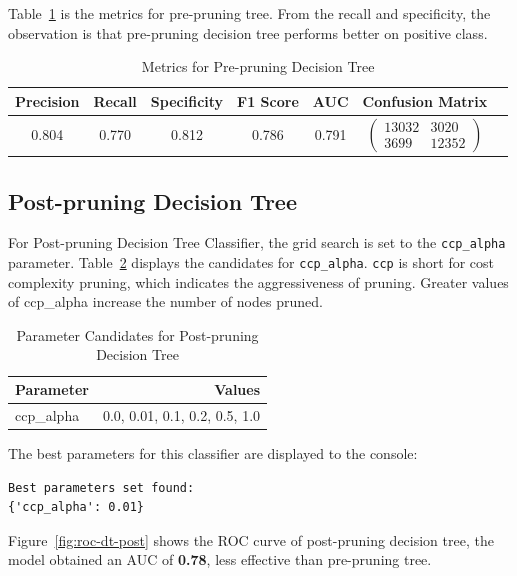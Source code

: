 Table~\ref{tab:pre-dt} is the metrics for pre-pruning tree. From the recall and specificity, the observation is that pre-pruning decision tree performs better on positive class.

\begin{table}
\centering
\begin{tabular}{|c|c|c|c|c|c|c}
\hline
\textbf{Precision} & \textbf{Recall} & \textbf{Specificity} & \textbf{F1 Score} & \textbf{AUC} & \textbf{Confusion Matrix} \\
\hline
0.804 & 0.770 & 0.812 & 0.786 & 0.791 & $\left(\begin{array}{cc} 13032 & 3020 \\ 3699 & 12352 \end{array}\right)$ \\ 
\hline
\end{tabular}
\caption{Metrics for Pre-pruning Decision Tree}
\label{tab:pre-dt}
\end{table}

\subsection{Post-pruning Decision Tree}

For Post-pruning Decision Tree Classifier, the grid search is set to the \texttt{ccp\_alpha} parameter. Table~\ref{tab:parameters-dt-post} displays the candidates for \texttt{ccp\_alpha}. \texttt{ccp} is short for cost complexity pruning, which indicates the aggressiveness of pruning. Greater values of ccp\_alpha increase the number of nodes pruned.

\begin{table}[h]
\centering
\begin{tabular}{|l|r|}
\hline
\textbf{Parameter} & \textbf{Values}            \\ \hline
ccp\_alpha         & 0.0, 0.01, 0.1, 0.2, 0.5, 1.0 \\ \hline
\end{tabular}
\caption{Parameter Candidates for Post-pruning Decision Tree}
\label{tab:parameters-dt-post}
\end{table}
The best parameters for this classifier are displayed to the console:

\begin{verbatim}
Best parameters set found:
{'ccp_alpha': 0.01}
\end{verbatim}

Figure~\ref{fig:roc-dt-post} shows the ROC curve of post-pruning decision tree, the model obtained an AUC of \textbf{0.78}, less effective than pre-pruning tree.

